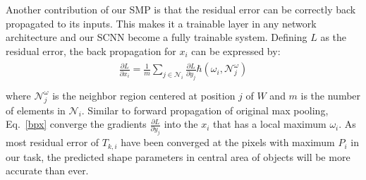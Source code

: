 Another contribution of our SMP is that the residual error can be correctly back propagated to its inputs.
This makes it a trainable layer in any network architecture and our SCNN become a fully trainable system.
Defining $L$ as the residual error, the back propagation for $x_{i}$ can be expressed by:
\begin{eqnarray}\label{bpx}
\begin{aligned}
\frac{\partial L}{\partial x_{i}}=\frac{1}{m}\sum\limits_{j\in\mathcal{N}_{i}}\frac{\partial L}{\partial y_{j}}\hbar(\omega_{i},{\mathcal{N}}^{\omega}_{j})\\
\end{aligned}
\end{eqnarray}
where $\mathcal{N}^{\omega}_{j}$ is the neighbor region centered at position $j$ of $W$ and $m$ is the number of elements in $\mathcal{N}_{i}$.
Similar to forward propagation of original max pooling, Eq.~\ref{bpx} converge the gradients $\frac{\partial L}{\partial y_{j}}$ into the $x_{i}$ that has a local maximum $\omega_{i}$.
As most residual error of $T_{k,i}$ have been converged at the pixels with maximum $P_i$ in our task, the predicted shape parameters in central area of objects will be more accurate than ever.


